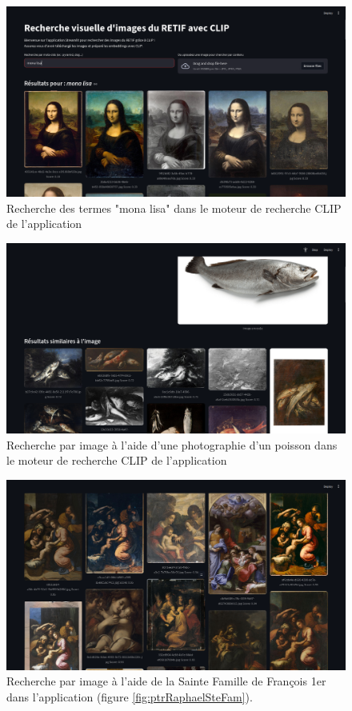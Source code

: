\begin{figure}[H]
    \centering
    \includegraphics[width=1\textwidth]{annexes/figures/APP-monalisa.png}
    \caption{Recherche des termes "mona lisa" dans le moteur de recherche CLIP de l'application}
    \label{fig:APP-monalisa}
\end{figure}

\begin{figure}[H]
    \centering
    \includegraphics[width=1\textwidth]{annexes/figures/APP-poisson.png}
    \caption{Recherche par image à l'aide d'une photographie d'un poisson dans le moteur de recherche CLIP de l'application}
    \label{fig:APP-poisson}
\end{figure}

\begin{figure}[H]
    \centering
    \includegraphics[width=1\textwidth]{annexes/figures/APP-raphael.png}
    \caption{Recherche par image à l'aide de la Sainte Famille de François 1er dans l'application (figure \ref{fig:ptrRaphaelSteFam}).}
    \label{fig:APP-raphael}
\end{figure}

